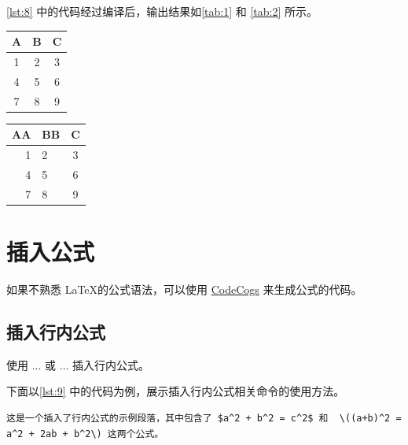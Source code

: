\documentclass[a4paper]{article}
\begin{document}
\cref{lst:8} 中的代码经过编译后，输出结果如\cref{tab:1} 和 \cref{tab:2} 所示。

\begin{center}
    \label{tab:1}
    \begin{tabular}{|c|c|c|}   
        \hline
        A & B & C \\
        \hline
        1 & 2 & 3 \\
        \hline
        4 & 5 & 6 \\
        \hline
        7 & 8 & 9 \\
        \hline
    \end{tabular}
\end{center}

\begin{center}
    \label{tab:2}
    \begin{tabular}{r||l c|}
        \hline
        AA & BB & C \\
        \hline
        1 & 2 & 3 \\
        4 & 5 & 6 \\
        \hline
        \hline
        7 & 8 & 9 \\
    \end{tabular}
\end{center}

\section{插入公式}

如果不熟悉 \LaTeX 的公式语法，可以使用 \href{https://www.codecogs.com/latex/eqneditor.php}{CodeCogs} 来生成公式的代码。

\subsection{插入行内公式}

使用 \texttt{$...$} 或 \texttt{\(...\)} 插入行内公式。

下面以\cref{lst:9} 中的代码为例，展示插入行内公式相关命令的使用方法。

\begin{center}
    \label{lst:9}
    \begin{verbatim}
这是一个插入了行内公式的示例段落，其中包含了 $a^2 + b^2 = c^2$ 和  \((a+b)^2 = a^2 + 2ab + b^2\) 这两个公式。
    \end{verbatim}
\end{center}
\end{document}
